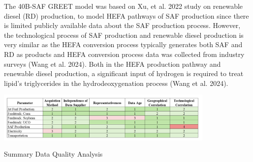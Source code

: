 \documentclass[12pt]{article}
\begin{document}
The 40B-SAF GREET model was based on Xu, et al. 2022 study on renewable diesel (RD) production, to model HEFA pathways of SAF production since there is limited publicly available data about the SAF production process. However, the technological process of SAF production and renewable diesel production is very similar as the HEFA conversion process typically generates both SAF and RD as products and HEFA conversion process data was collected from industry surveys (Wang et al. 2024). Both in the HEFA production pathway and renewable diesel production, a significant input of hydrogen is required to treat lipid’s triglycerides in the hydrodeoxygenation process (Wang et al. 2024). 

\begin{table}[H]
\centering
\includegraphics[width=0.8\textwidth]{dataqual.png} %
\caption{Summary Data Quality Analysis}
\label{table:perc}
\end{table}
\end{document}
